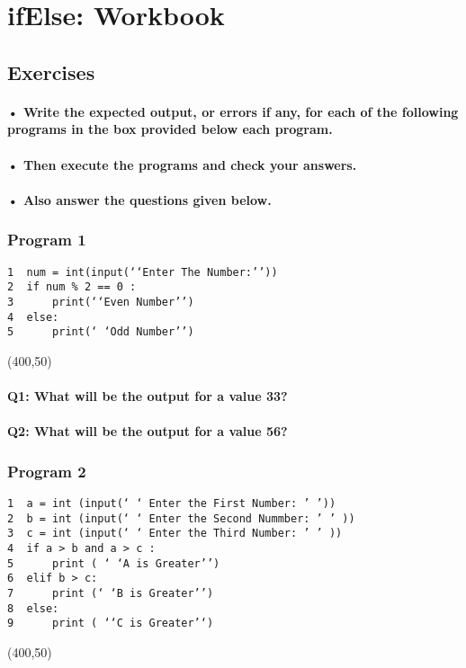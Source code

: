 \documentclass{article}
\begin{document}
\section{ifElse: Workbook}

\subsection{Exercises}
\paragraph{• Write the expected output, or errors if any, for each of the following programs in the box provided below each program.}
\paragraph{• Then execute the programs and check your answers.}
\paragraph{• Also answer the questions given below.}

\subsubsection{Program 1}
\begin{verbatim}
1  num = int(input(‘‘Enter The Number:’’))
2  if num % 2 == 0 :
3      print(‘‘Even Number’’)
4  else:
5      print(‘ ‘Odd Number’’)
\end{verbatim}

\framebox(400,50){}

\paragraph{Q1: What will be the output for a value 33?}
\paragraph{Q2: What will be the output for a value 56?}

\subsubsection{Program 2}
\begin{verbatim}
1  a = int (input(‘ ‘ Enter the First Number: ’ ’))
2  b = int (input(‘ ‘ Enter the Second Nummber: ’ ’ ))
3  c = int (input(‘ ‘ Enter the Third Number: ’ ’ ))
4  if a > b and a > c :
5      print ( ‘ ‘A is Greater’’)
6  elif b > c:
7      print (‘ ‘B is Greater’’)
8  else:
9      print ( ‘‘C is Greater’‘)
\end{verbatim}
\framebox(400,50){}
\end{document}
